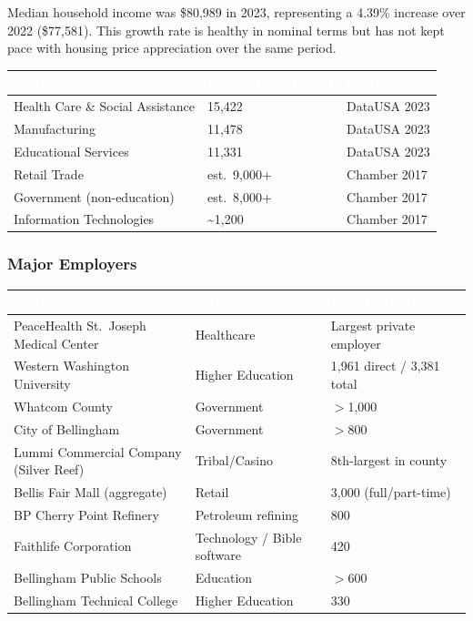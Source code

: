 \documentclass[11pt,letterpaper]{article}
\newcommand{\tableheader}[1]{\textbf{\sffamily\textcolor{white}{#1}}}
\begin{document}
Median household income was \$80,989 in 2023, representing a 4.39\% increase over 2022 (\$77,581). This growth rate is healthy in nominal terms but has not kept pace with housing price appreciation over the same period.

\begin{center}
\begin{tabularx}{\textwidth}{XC{3cm}L{3.5cm}}
\toprule
{}
\tableheader{Sector} & \tableheader{Employment (2023)} & \tableheader{Source} \\
\midrule
Health Care \& Social Assistance & 15,422 & DataUSA 2023 \\
Manufacturing & 11,478 & DataUSA 2023 \\
Educational Services & 11,331 & DataUSA 2023 \\
Retail Trade & est.\ 9,000+ & Chamber 2017 \\
Government (non-education) & est.\ 8,000+ & Chamber 2017 \\
Information Technologies & \textasciitilde1,200 & Chamber 2017 \\
\bottomrule
\end{tabularx}
\end{center}

\subsubsection{Major Employers}

\begin{center}
\begin{tabularx}{\textwidth}{L{4.5cm}XL{3cm}}
\toprule
{}
\tableheader{Employer} & \tableheader{Sector} & \tableheader{Est.\ Employment} \\
\midrule
PeaceHealth St.\ Joseph Medical Center & Healthcare & Largest private employer \\
Western Washington University & Higher Education & 1,961 direct / 3,381 total \\
Whatcom County & Government & $>$1,000 \\
City of Bellingham & Government & $>$800 \\
Lummi Commercial Company (Silver Reef) & Tribal/Casino & 8th-largest in county \\
Bellis Fair Mall (aggregate) & Retail & 3,000 (full/part-time) \\
BP Cherry Point Refinery & Petroleum refining & 800 \\
Faithlife Corporation & Technology / Bible software & 420 \\
Bellingham Public Schools & Education & $>$600 \\
Bellingham Technical College & Higher Education & 330 \\
\bottomrule
\end{tabularx}
\end{center}
\end{document}
